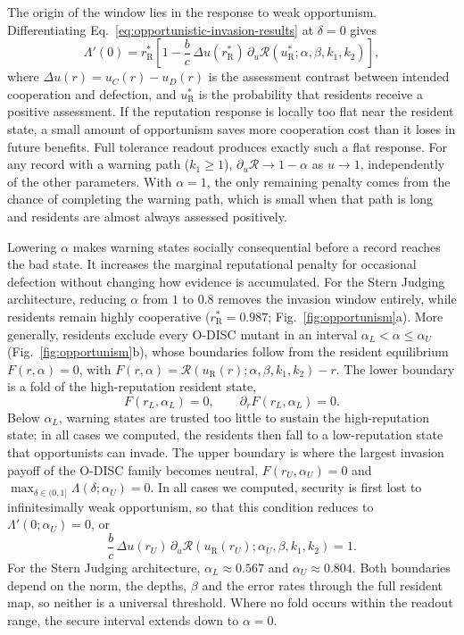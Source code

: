 \documentclass[fleqn,10pt]{article}
\begin{document}
The origin of the window lies in the response to weak opportunism. Differentiating Eq.~\eqref{eq:opportunistic-invasion-results} at $\delta=0$ gives
\begin{equation}
\Lambda'(0)
=r_{\mathrm R}^*\left[1-\frac{b}{c}\,\Delta u(r_{\mathrm R}^*)\,
\partial_u\mathcal R\!\left(u_{\mathrm R}^*;\alpha,\beta,k_1,k_2\right)\right],
\label{eq:opportunistic-slope-results}
\end{equation}
where $\Delta u(r)=u_C(r)-u_D(r)$ is the assessment contrast between intended cooperation and defection, and $u_{\mathrm R}^*$ is the probability that residents receive a positive assessment. If the reputation response is locally too flat near the resident state, a small amount of opportunism saves more cooperation cost than it loses in future benefits. Full tolerance readout produces exactly such a flat response. For any record with a warning path ($k_1\geq1$), $\partial_u\mathcal R\to1-\alpha$ as $u\to1$, independently of the other parameters. With $\alpha=1$, the only remaining penalty comes from the chance of completing the warning path, which is small when that path is long and residents are almost always assessed positively.

Lowering $\alpha$ makes warning states socially consequential before a record reaches the bad state. It increases the marginal reputational penalty for occasional defection without changing how evidence is accumulated. For the Stern Judging architecture, reducing $\alpha$ from $1$ to $0.8$ removes the invasion window entirely, while residents remain highly cooperative ($r_{\mathrm R}^*=0.987$; Fig.~\ref{fig:opportunism}a). More generally, residents exclude every O-DISC mutant in an interval $\alpha_L<\alpha\leq\alpha_U$ (Fig.~\ref{fig:opportunism}b), whose boundaries follow from the resident equilibrium $F(r,\alpha)=0$, with $F(r,\alpha)=\mathcal R(u_{\mathrm R}(r);\alpha,\beta,k_1,k_2)-r$. The lower boundary is a fold of the high-reputation resident state,
\begin{equation}
F(r_L,\alpha_L)=0,\qquad \partial_rF(r_L,\alpha_L)=0.
\label{eq:results-alpha-lower}
\end{equation}
Below $\alpha_L$, warning states are trusted too little to sustain the high-reputation state; in all cases we computed, the residents then fall to a low-reputation state that opportunists can invade. The upper boundary is where the largest invasion payoff of the O-DISC family becomes neutral, $F(r_U,\alpha_U)=0$ and $\max_{\delta\in(0,1]}\Lambda(\delta;\alpha_U)=0$. In all cases we computed, security is first lost to infinitesimally weak opportunism, so that this condition reduces to $\Lambda'(0;\alpha_U)=0$, or
\begin{equation}
\frac bc\,\Delta u(r_U)\,
\partial_u\mathcal R\!\left(u_{\mathrm R}(r_U);\alpha_U,\beta,k_1,k_2\right)=1.
\label{eq:results-alpha-upper}
\end{equation}
For the Stern Judging architecture, $\alpha_L\approx0.567$ and $\alpha_U\approx0.804$. Both boundaries depend on the norm, the depths, $\beta$ and the error rates through the full resident map, so neither is a universal threshold. Where no fold occurs within the readout range, the secure interval extends down to $\alpha=0$.
\end{document}
